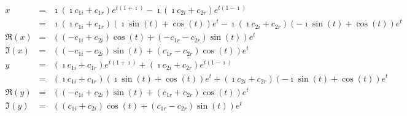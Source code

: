 \begin{eqnarray}
x &=&\mathbf{\imath} \left(\mathbf{\imath} c_{1i} + c_{1r}\right) e^{t \left(1 + \mathbf{\imath}\right)} - \mathbf{\imath} \left(\mathbf{\imath} c_{2i} + c_{2r}\right) e^{t \left(1 - \mathbf{\imath}\right)}\nonumber \\&=&\mathbf{\imath} \left(\mathbf{\imath} c_{1i} + c_{1r}\right) \left(\mathbf{\imath} \sin{\left (t \right )} + \cos{\left (t \right )}\right) e^{t} - \mathbf{\imath} \left(\mathbf{\imath} c_{2i} + c_{2r}\right) \left(- \mathbf{\imath} \sin{\left (t \right )} + \cos{\left (t \right )}\right) e^{t}\nonumber \\\Re(x)&=&\left(\left(- c_{1i} + c_{2i}\right) \cos{\left (t \right )} + \left(- c_{1r} - c_{2r}\right) \sin{\left (t \right )}\right) e^{t}\nonumber \\\Im(x)&=&\left(\left(- c_{1i} - c_{2i}\right) \sin{\left (t \right )} + \left(c_{1r} - c_{2r}\right) \cos{\left (t \right )}\right) e^{t}\nonumber \\y &=&\left(\mathbf{\imath} c_{1i} + c_{1r}\right) e^{t \left(1 + \mathbf{\imath}\right)} + \left(\mathbf{\imath} c_{2i} + c_{2r}\right) e^{t \left(1 - \mathbf{\imath}\right)}\nonumber \\&=&\left(\mathbf{\imath} c_{1i} + c_{1r}\right) \left(\mathbf{\imath} \sin{\left (t \right )} + \cos{\left (t \right )}\right) e^{t} + \left(\mathbf{\imath} c_{2i} + c_{2r}\right) \left(- \mathbf{\imath} \sin{\left (t \right )} + \cos{\left (t \right )}\right) e^{t}\nonumber \\\Re(y)&=&\left(\left(- c_{1i} + c_{2i}\right) \sin{\left (t \right )} + \left(c_{1r} + c_{2r}\right) \cos{\left (t \right )}\right) e^{t}\nonumber \\\Im(y)&=&\left(\left(c_{1i} + c_{2i}\right) \cos{\left (t \right )} + \left(c_{1r} - c_{2r}\right) \sin{\left (t \right )}\right) e^{t}\nonumber \\\end{eqnarray}
